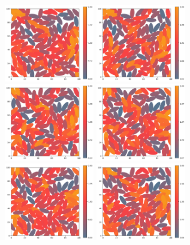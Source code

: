 \begin{figure}[!ht]
    \centering
    \includegraphics[width=0.35\textwidth]{./figures/runs/delta_a_01/run01}
    \includegraphics[width=0.35\textwidth]{./figures/runs/delta_a_01/run02}
    \includegraphics[width=0.35\textwidth]{./figures/runs/delta_a_01/run03}
    \includegraphics[width=0.35\textwidth]{./figures/runs/delta_a_01/run04}
    \includegraphics[width=0.35\textwidth]{./figures/runs/delta_a_01/run05}
    \includegraphics[width=0.35\textwidth]{./figures/runs/delta_a_01/run06}

\end{figure}
